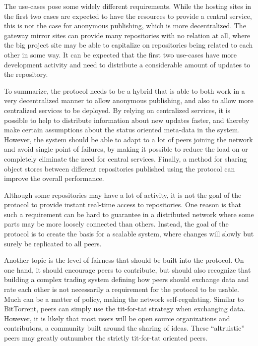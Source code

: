 The use-cases pose some widely different requirements. While the
hosting sites in the first two cases are expected to have the
resources to provide a central service, this is not the case for
anonymous publishing, which is more decentralized. The gateway mirror
sites can provide many repositories with no relation at all, where the
big project site may be able to capitalize on repositories being
related to each other in some way. It can be expected that the first
two use-cases have more development activity and need to distribute a
considerable amount of updates to the repository.

To summarize, the protocol needs to be a hybrid that is able to both
work in a very decentralized manner to allow anonymous publishing, and
also to allow more centralized services to be deployed. By relying on
centralized services, it is possible to help to distribute information
about new updates faster, and thereby make certain assumptions about
the status oriented meta-data in the system. However, the system
should be able to adapt to a lot of peers joining the network and
avoid single point of failures, by making it possible to reduce the
load on or completely eliminate the need for central services.
Finally, a method for sharing object stores between different
repositories published using the protocol can improve the overall
performance.

Although some repositories may have a lot of activity, it is not the
goal of the protocol to provide instant real-time access to
repositories. One reason is that such a requirement can be hard to
guarantee in a distributed network where some parts may be more
loosely connected than others. Instead, the goal of the protocol is to
create the basis for a scalable system, where changes will slowly but surely be
replicated to all peers.

Another topic is the level of fairness that should be built into the
protocol. On one hand, it should encourage peers to contribute, but
should also recognize that building a complex trading system defining
how peers should exchange data and rate each other is not necessarily
a requirement for the protocol to be usable. Much can be a
matter of policy, making the network self-regulating.  Similar to
BitTorrent, peers can simply use the tit-for-tat strategy when
exchanging data.  However, it is likely that most users will be open
source organizations and contributors, a community built around the
sharing of ideas.  These ``altruistic'' peers may greatly outnumber
the strictly tit-for-tat oriented peers.

